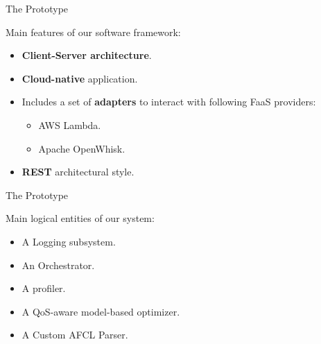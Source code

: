 \documentclass[13.5pt]{beamer}
\newcommand{\B}[1]{\textcolor{TorVergataColor}{\textbf{#1}}}
\begin{document}

\begin{frame}{The Prototype}
	
 	Main features of our software framework:
	\vspace{\baselineskip}
	\begin{itemize}
		\item \B{Client-Server architecture}.
		\item \B{Cloud-native} application.
		\item Includes a set of \B{adapters} to interact with following FaaS providers:
		\begin{itemize}
			\item AWS Lambda.
			\item Apache OpenWhisk.
		\end{itemize}
		\item \B{REST} architectural style.
	\end{itemize}
	
\end{frame} 
\begin{frame}{The Prototype}
	
	Main logical entities of our system:
	
	\begin{itemize}
		\item A Logging subsystem.
		\item An Orchestrator.
		\item A profiler.
		\item A QoS-aware model-based optimizer.
		\item A Custom AFCL Parser.
	\end{itemize}
	
\end{frame} 
\end{document}
